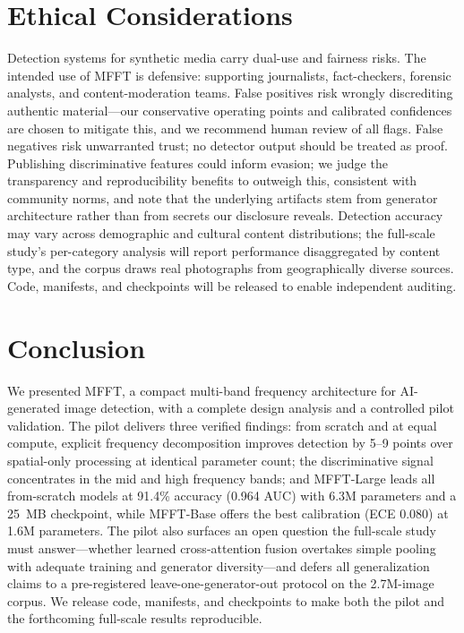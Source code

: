 \documentclass[journal]{IEEEtran}
\begin{document}
\section{Ethical Considerations}
Detection systems for synthetic media carry dual-use and fairness risks. The intended use of MFFT is defensive: supporting journalists, fact-checkers, forensic analysts, and content-moderation teams. False positives risk wrongly discrediting authentic material---our conservative operating points and calibrated confidences are chosen to mitigate this, and we recommend human review of all flags. False negatives risk unwarranted trust; no detector output should be treated as proof. Publishing discriminative features could inform evasion; we judge the transparency and reproducibility benefits to outweigh this, consistent with community norms, and note that the underlying artifacts stem from generator architecture rather than from secrets our disclosure reveals. Detection accuracy may vary across demographic and cultural content distributions; the full-scale study's per-category analysis will report performance disaggregated by content type, and the corpus draws real photographs from geographically diverse sources. Code, manifests, and checkpoints will be released to enable independent auditing.

\section{Conclusion}
We presented MFFT, a compact multi-band frequency architecture for AI-generated image detection, with a complete design analysis and a controlled pilot validation. The pilot delivers three verified findings: from scratch and at equal compute, explicit frequency decomposition improves detection by 5--9 points over spatial-only processing at identical parameter count; the discriminative signal concentrates in the mid and high frequency bands; and MFFT-Large leads all from-scratch models at 91.4\% accuracy (0.964 AUC) with 6.3M parameters and a 25~MB checkpoint, while MFFT-Base offers the best calibration (ECE 0.080) at 1.6M parameters. The pilot also surfaces an open question the full-scale study must answer---whether learned cross-attention fusion overtakes simple pooling with adequate training and generator diversity---and defers all generalization claims to a pre-registered leave-one-generator-out protocol on the 2.7M-image corpus. We release code, manifests, and checkpoints to make both the pilot and the forthcoming full-scale results reproducible.
\end{document}
